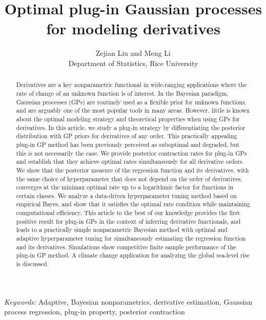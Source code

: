 \documentclass[12pt]{article}
\theoremstyle{plain}
\theoremstyle{nonitalicremark}
\begin{document}
\def\spacingset#1{\renewcommand{\baselinestretch}
{#1}\small\normalsize} \spacingset{1}


\title{\bf Optimal plug-in Gaussian processes for modeling derivatives}
\author{Zejian Liu and Meng Li\\
Department of Statistics, Rice University}
\date{}
\maketitle


\bigskip

\begin{abstract}
Derivatives are a key nonparametric functional in wide-ranging applications where the rate of change of an unknown function is of interest. In the Bayesian paradigm, Gaussian processes (GPs) are routinely used as a flexible prior for unknown functions, and are arguably one of the most popular tools in many areas. However, little is known about the optimal modeling strategy and theoretical properties when using GPs for derivatives. In this article, we study a plug-in strategy by differentiating the posterior distribution with GP priors for derivatives of any order. This practically appealing plug-in GP method has been previously perceived as suboptimal and degraded, but this is not necessarily the case. We provide posterior contraction rates for plug-in GPs and establish that they achieve optimal rates simultaneously for all derivative orders. We show that the posterior measure of the regression function and its derivatives, with the same choice of hyperparameter that does not depend on the order of derivatives, converges at the minimax optimal rate up to a logarithmic factor for functions in certain classes. We analyze a data-driven hyperparameter tuning method based on empirical Bayes, and show that it satisfies the optimal rate condition while maintaining computational efficiency. This article to the best of our knowledge provides the first positive result for plug-in GPs in the context of inferring derivative functionals, and leads to a practically simple nonparametric Bayesian method with optimal and adaptive hyperparameter tuning for simultaneously estimating the regression function and its derivatives. Simulations show competitive finite sample performance of the plug-in GP method. A climate change application for analyzing the global sea-level rise is discussed. 
\end{abstract}

\noindent
{\it Keywords:} Adaptive, Bayesian nonparametrics, derivative estimation, Gaussian process regression, plug-in property, posterior contraction
\vfill
\end{document}

